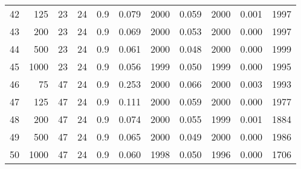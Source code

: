 \documentclass{article}
\begin{document}
\begin{tabular}{rrrrrrrrrrr}
  42 & 125 & 23 & 24 & 0.9 & 0.079 & 2000 & 0.059 & 2000 & 0.001 & 1997 \\ 
  43 & 200 & 23 & 24 & 0.9 & 0.069 & 2000 & 0.053 & 2000 & 0.000 & 1997 \\ 
  44 & 500 & 23 & 24 & 0.9 & 0.061 & 2000 & 0.048 & 2000 & 0.000 & 1999 \\ 
  45 & 1000 & 23 & 24 & 0.9 & 0.056 & 1999 & 0.050 & 1999 & 0.000 & 1995 \\ 
   \hline
46 & 75 & 47 & 24 & 0.9 & 0.253 & 2000 & 0.066 & 2000 & 0.003 & 1993 \\ 
  47 & 125 & 47 & 24 & 0.9 & 0.111 & 2000 & 0.059 & 2000 & 0.000 & 1977 \\ 
  48 & 200 & 47 & 24 & 0.9 & 0.074 & 2000 & 0.055 & 1999 & 0.001 & 1884 \\ 
  49 & 500 & 47 & 24 & 0.9 & 0.065 & 2000 & 0.049 & 2000 & 0.000 & 1986 \\ 
  50 & 1000 & 47 & 24 & 0.9 & 0.060 & 1998 & 0.050 & 1996 & 0.000 & 1706 \\ 
   \hline
\end{tabular}
\end{document}
